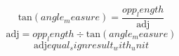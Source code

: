 \[\text{{tan}}({angle_measure})=\frac{{{opp_length}}}{{\text{{{adj}}}}}\]
\[\text{{{adj}}}={opp_length}\div \text{{tan}}({angle_measure})\]
\[\text{{{adj}}}{equal_sign}{result_with_unit}\]
